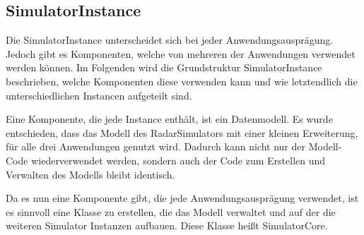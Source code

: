 \subsection{SimulatorInstance}
Die SimulatorInstance unterscheidet sich bei jeder Anwendungsausprägung. Jedoch gibt es Komponenten, welche von mehreren der Anwendungen verwendet werden 
können. Im Folgenden wird die Grundstruktur SimulatorInstance beschrieben, welche Komponenten diese verwenden kann und wie letztendlich die 
unterschiedlichen Instancen aufgeteilt sind.

Eine Komponente, die jede Instance enthält, ist ein Datenmodell. Es wurde entschieden, dass das Modell des RadarSimulators mit einer kleinen Erweiterung,
 für alle drei Anwendungen genutzt wird. Dadurch kann nicht nur der Modell-Code wiederverwendet werden, sondern auch der Code zum Erstellen und Verwalten 
des Modells bleibt identisch.

Da es nun eine Komponente gibt, die jede Anwendungsausprägung verwendet, ist es sinnvoll eine Klasse zu erstellen, die das Modell verwaltet und auf der 
die weiteren Simulator Instanzen aufbauen. Diese Klasse heißt SimulatorCore.

